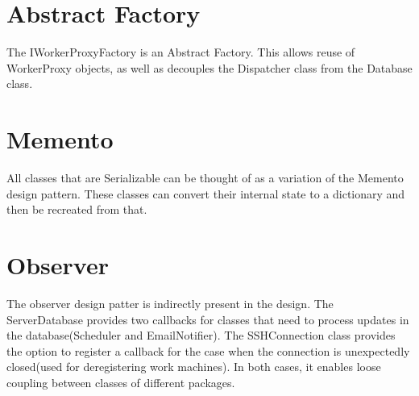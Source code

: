     \section{Abstract Factory}
        The IWorkerProxyFactory is an Abstract Factory. This allows reuse of WorkerProxy objects, as well as decouples the Dispatcher
        class from the Database class.

    \section{Memento}
        All classes that are Serializable can be thought of as a variation of the Memento design pattern.
        These classes can convert their internal state to a dictionary and then be recreated from that.

    \section{Observer}
        The observer design patter is indirectly present in the design. The ServerDatabase provides two callbacks
        for classes that need to process updates in the database(Scheduler and EmailNotifier). The SSHConnection class
            provides the option to register a callback for the case when the connection is unexpectedly closed(used for
            deregistering work machines). In both cases, it enables loose coupling between classes of different packages.
